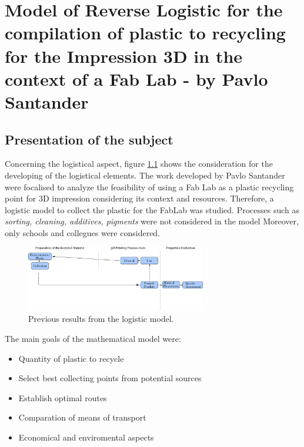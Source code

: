 

\chapter{Model of Reverse Logistic for the compilation of plastic to recycling for the Impression 3D in the context of a Fab Lab - by Pavlo Santander}

\section{Presentation of the subject}

Concerning the logistical aspect, figure \ref{Context.Pavlo} shows the consideration for the developing of the logistical elements.
The work developed by Pavlo Santander were focalised to analyze the feasibility of using a Fab Lab as a plastic recycling point for 3D impression considering its context and resources.
Therefore, a logistic model to collect the plastic for the FabLab was studied.
Processes such as \textit{sorting, cleaning, additives, pigments} were not considered in the model
Moreover, only schools and collegues were considered. 

\begin{figure}[H]
	\centering
	\includegraphics[width=0.7\textwidth]{Figures/Pavlo/Context-Pavlo.pdf}
	\caption{Previous results from the logistic model.}
	\label{Context.Pavlo}		
\end{figure}



The main goals of the mathematical model were:


\begin{itemize}[noitemsep]
	\item Quantity of plastic to recycle
	\item Select best collecting points from potential sources
	\item Establish optimal routes
	\item Comparation of means of transport
	\item Economical and enviromental aspects
\end{itemize}

